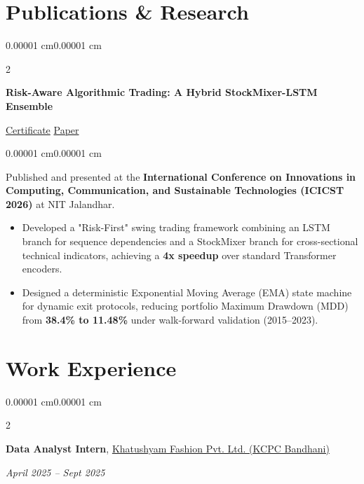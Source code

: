 \documentclass[10pt, letterpaper]{article}
\newenvironment{highlights}{
    \begin{itemize}[
        topsep=0.10 cm,
        parsep=0.10 cm,
        partopsep=0pt,
        itemsep=0pt,
        leftmargin=10pt
    ]
}{
    \end{itemize}
}
\newenvironment{onecolentry}{
    \begin{adjustwidth}{0.00001 cm}{0.00001 cm}
}{
    \end{adjustwidth}
}
\newenvironment{twocolentry}[2][]{
    \onecolentry
    \def\secondColumn{#2}
    \setcolumnwidth{\fill, 4.5 cm}
    \begin{paracol}{2}
}{
    \switchcolumn \raggedleft \secondColumn
    \end{paracol}
    \endonecolentry
}
\begin{document}
\section{\textcolor{myblue}{\textbf{Publications \& Research}}}

\begin{twocolentry}{\href{https://drive.google.com/file/d/1oR-lRNecWsgggFe9yg5z0AusXVkxULqW/view?usp=drive_link}{\textcolor{myblue}{\faIcon{file-pdf} Certificate}} \AND \href{https://drive.google.com/file/d/15pBYaDY7quubpf7l78054bXx72TWyh6Z/view?usp=drive_link}{\textcolor{myblue}{\faIcon{link} Paper}}}
\textbf{Risk-Aware Algorithmic Trading: A Hybrid StockMixer-LSTM Ensemble}
\end{twocolentry}

\vspace{0.06cm}

\begin{onecolentry}
Published and presented at the \textbf{International Conference on Innovations in Computing, Communication, and Sustainable Technologies (ICICST 2026)} at NIT Jalandhar.
\begin{highlights}
\item Developed a "Risk-First" swing trading framework combining an LSTM branch for sequence dependencies and a StockMixer branch for cross-sectional technical indicators, achieving a \textbf{4x speedup} over standard Transformer encoders.
\item Designed a deterministic Exponential Moving Average (EMA) state machine for dynamic exit protocols, reducing portfolio Maximum Drawdown (MDD) from \textbf{38.4\% to 11.48\%} under walk-forward validation (2015--2023).
\end{highlights}
\end{onecolentry}

\vspace{0.08 cm}

\section{\textcolor{myblue}{\textbf{Work Experience}}}

\begin{twocolentry}{\textit{April 2025 -- Sept 2025}}
\textbf{Data Analyst Intern}, \textcolor{myblue}{\underline{Khatushyam Fashion Pvt. Ltd. (KCPC Bandhani)}} \kern 2pt \href{https://drive.google.com/file/d/1kYHlutb7SgPZy7kuYSGTyOVHQhtVsAyp/view?usp=drive_link}{\textcolor{myblue}{}}
\end{twocolentry}
\end{document}
